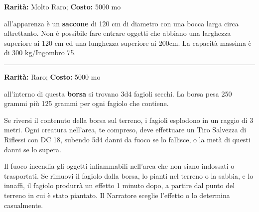 \begin{multicols}{2}
\textbf{Rarità:} Molto Raro; \textbf{Costo:} 5000 mo

all'apparenza è un \textbf{saccone} di 120 cm di diametro con una bocca larga circa altrettanto.
Non è possibile fare entrare oggetti che abbiano una larghezza superiore ai 120 cm ed una lunghezza superiore ai 200cm. La capacità massima è di 300 kg/Ingombro 75.

\smallskip\noindent\rule{\linewidth}{2pt}  \hypertarget{BorsadeiFagioli}{}\medskip{}\noindent\label{BorsadeiFagioli}

\textbf{Rarità:} Raro; \textbf{Costo:} 5000 mo

all'interno di questa \textbf{borsa} si trovano 3d4 fagioli secchi. La borsa pesa 250 grammi più 125 grammi per ogni fagiolo che contiene.

Se riversi il contenuto della borsa sul terreno, i fagioli esplodono in un raggio di 3 metri. Ogni creatura nell'area, te compreso, deve effettuare un Tiro Salvezza di Riflessi con DC 18, subendo 5d4 danni da fuoco se lo fallisce, o la metà di questi danni se lo supera.

Il fuoco incendia gli oggetti infiammabili nell'area che non siano indossati o trasportati. Se rimuovi il fagiolo dalla borsa, lo pianti nel terreno o la sabbia, e lo innaffi, il fagiolo produrrà un effetto 1 minuto dopo, a partire dal punto del terreno in cui è stato piantato. Il Narratore sceglie l'effetto o lo determina casualmente.

\medskip


\end{multicols}
